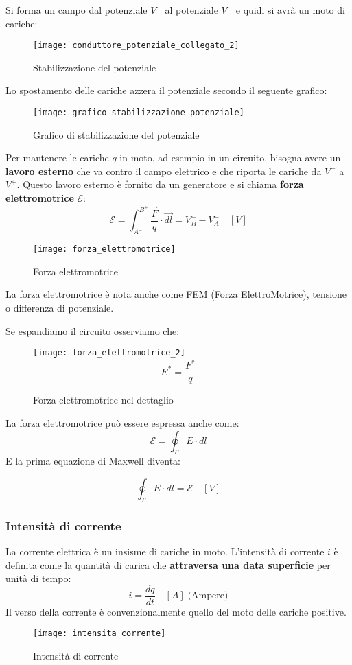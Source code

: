 \documentclass[a4paper]{article}
\begin{document}
Si forma un campo dal potenziale \( V^+ \) al potenziale \( V^- \)  e quidi si avrà
un moto di cariche:
\begin{figure}[H]
  \centering
  \texttt{[image: conduttore\_potenziale\_collegato\_2]}
  \caption{Stabilizzazione del potenziale}
\end{figure}
\noindent
Lo spostamento delle cariche azzera il potenziale secondo il seguente grafico:
\begin{figure}[H]
  \centering
  \texttt{[image: grafico\_stabilizzazione\_potenziale]}
  \caption{Grafico di stabilizzazione del potenziale}
\end{figure}
\noindent
Per mantenere le cariche \( q \) in moto, ad esempio in un circuito, bisogna avere un \textbf{lavoro
esterno} che va contro il campo elettrico e che riporta le cariche da \( V^- \) a
\( V^+ \). Questo lavoro esterno è fornito da un generatore e si chiama \textbf{forza
elettromotrice} \( \mathcal{E} \):
\[
  \mathcal{E} = \int_{A^-}^{B^+} \frac{\vec{F}}{q} \cdot \vec{dl}
  = V^+_B - V^-_A \quad \left[ V \right]
\] 
\begin{figure}[H]
  \centering
  \texttt{[image: forza\_elettromotrice]}
  \caption{Forza elettromotrice}
\end{figure}
\noindent
La forza elettromotrice è nota anche come FEM (Forza ElettroMotrice), tensione o
differenza di potenziale.

\vspace{1em}
\noindent
Se espandiamo il circuito osserviamo che:
\begin{figure}[H]
  \centering
  \texttt{[image: forza\_elettromotrice\_2]}
  \[
    E^* = \frac{F^*}{q}
  \] 
  \caption{Forza elettromotrice nel dettaglio}
\end{figure}
\noindent
La forza elettromotrice può essere espressa anche come:
\[
  \mathcal{E} = \oint_{\Gamma} E \cdot dl
\] 
E la prima equazione di Maxwell diventa:
\begin{definition}
  \[
    \oint_{\Gamma} E \cdot dl = \mathcal{E} \quad \left[ V \right]
  \]
\end{definition}

\subsubsection{Intensità di corrente}
La corrente elettrica è un insisme di cariche in moto. L'intensità di corrente \( i \) 
è definita come la quantità di carica che \textbf{attraversa una data superficie} per
unità di tempo:
\[
  i = \frac{dq}{dt} \quad \left[ A \right] \; \text{(Ampere)}
\] 
Il verso della corrente è convenzionalmente quello del moto delle cariche positive.
\begin{figure}[H]
  \centering
  \texttt{[image: intensita\_corrente]}
  \caption{Intensità di corrente}
\end{figure}
\end{document}
